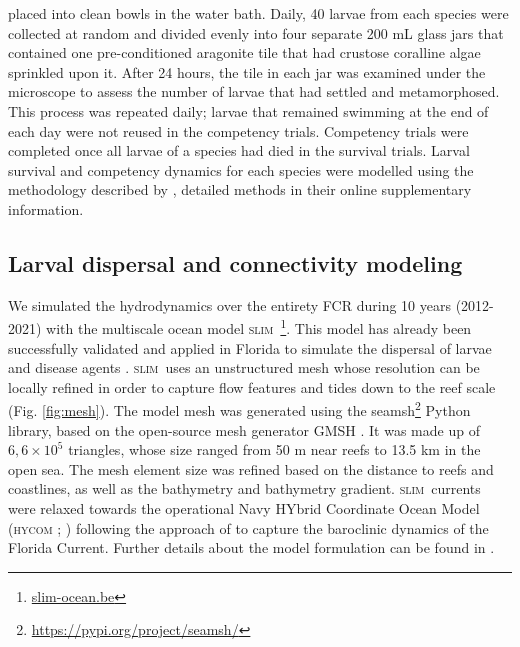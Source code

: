 \documentclass[preprint,12pt,authoryear]{elsarticle}
\newcommand{\hycom}{\textsc{hycom} }
\newcommand{\slim}{\textsc{slim}\ }
\begin{document}
placed into clean bowls in the water bath. Daily, 40 larvae from each species were collected at random and divided evenly into four separate 200 mL glass jars that contained one pre-conditioned aragonite tile that had crustose coralline algae sprinkled upon it. After 24 hours, the tile in each jar was examined under the microscope to assess the number of larvae that had settled and metamorphosed. This process was repeated daily; larvae that remained swimming at the end of each day were not reused in the competency trials. Competency trials were completed once all larvae of a species had died in the survival trials. Larval survival and competency dynamics for each species were modelled using the methodology described by \cite{figueiredo2022global}, detailed methods in their online supplementary information.

\subsection*{Larval dispersal and connectivity modeling}

We simulated the hydrodynamics over the entirety FCR during 10 years (2012-2021) with the multiscale ocean model \slim\footnote{\href{ https://www.slim-ocean.be}{slim-ocean.be}}. This model has already been successfully validated and applied in Florida to simulate the dispersal of larvae and disease agents \citep{frys2020fine,dobbelaere2020coupled}. \slim uses an unstructured mesh whose resolution can be locally refined in order to capture flow features and tides down to the reef scale (Fig. \ref{fig:mesh}). The model mesh was generated using the seamsh\footnote{\href{https://pypi.org/project/seamsh/}{https://pypi.org/project/seamsh/}} Python library, based on the open-source mesh generator GMSH \citep{geuzaine2009gmsh}. It was made up of $6,6\times 10^5$ triangles, whose size ranged from 50 m near reefs to 13.5 km in the open sea. The mesh element size was refined based on the distance to reefs and coastlines, as well as the bathymetry and bathymetry gradient. \slim currents were relaxed towards the operational Navy HYbrid Coordinate Ocean Model (\hycom; \citealp{chassignet2007hycom}) following the approach of \citep{dobbelaere2022impacts} to capture the baroclinic dynamics of the Florida Current. Further details about the model formulation can be found in \citep{frys2020fine}.
\end{document}
